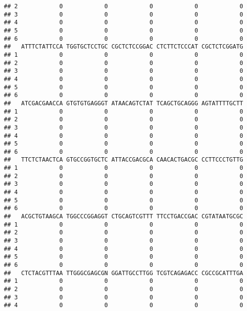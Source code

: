 \documentclass[]{article}
\begin{document}
\begin{verbatim}
## 2            0            0            0            0            0
## 3            0            0            0            0            0
## 4            0            0            0            0            0
## 5            0            0            0            0            0
## 6            0            0            0            0            0
##   ATTTCTATTCCA TGGTGCTCCTGC CGCTCTCCGGAC CTCTTCTCCCAT CGCTCTCGGATG
## 1            0            0            0            0            0
## 2            0            0            0            0            0
## 3            0            0            0            0            0
## 4            0            0            0            0            0
## 5            0            0            0            0            0
## 6            0            0            0            0            0
##   ATCGACGAACCA GTGTGTGAGGGT ATAACAGTCTAT TCAGCTGCAGGG AGTATTTTGCTT
## 1            0            0            0            0            0
## 2            0            0            0            0            0
## 3            0            0            0            0            0
## 4            0            0            0            0            0
## 5            0            0            0            0            0
## 6            0            0            0            0            0
##   TTCTCTAACTCA GTGCCGGTGCTC ATTACCGACGCA CAACACTGACGC CCTTCCCTGTTG
## 1            0            0            0            0            0
## 2            0            0            0            0            0
## 3            0            0            0            0            0
## 4            0            0            0            0            0
## 5            0            0            0            0            0
## 6            0            0            0            0            0
##   ACGCTGTAAGCA TGGCCCGGAGGT CTGCAGTCGTTT TTCCTGACCGAC CGTATAATGCGC
## 1            0            0            0            0            0
## 2            0            0            0            0            0
## 3            0            0            0            0            0
## 4            0            0            0            0            0
## 5            0            0            0            0            0
## 6            0            0            0            0            0
##   CTCTACGTTTAA TTGGGCGAGCGN GGATTGCCTTGG TCGTCAGAGACC CGCCGCATTTGA
## 1            0            0            0            0            0
## 2            0            0            0            0            0
## 3            0            0            0            0            0
## 4            0            0            0            0            0

\end{verbatim}
\end{document}
